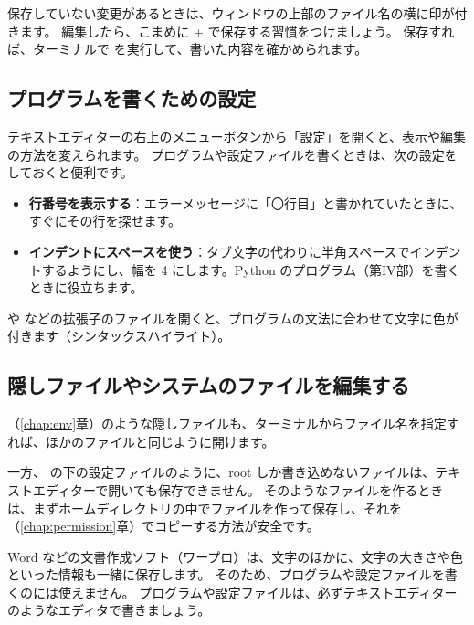 保存していない変更があるときは、ウィンドウの上部のファイル名の横に印が付きます。
編集したら、こまめに + で保存する習慣をつけましょう。
保存すれば、ターミナルで  を実行して、書いた内容を確かめられます。

\subsection{プログラムを書くための設定}

テキストエディターの右上のメニューボタンから「設定」を開くと、表示や編集の方法を変えられます。
プログラムや設定ファイルを書くときは、次の設定をしておくと便利です。

\begin{itemize}
  \item \textbf{行番号を表示する}：エラーメッセージに「〇行目」と書かれていたときに、すぐにその行を探せます。
  \item \textbf{インデントにスペースを使う}：タブ文字の代わりに半角スペースでインデントするようにし、幅を 4 にします。Python のプログラム（第IV部）を書くときに役立ちます。
\end{itemize}

 や  などの拡張子のファイルを開くと、プログラムの文法に合わせて文字に色が付きます（シンタックスハイライト）。

\subsection{隠しファイルやシステムのファイルを編集する}

（\ref{chap:env}章）のような隠しファイルも、ターミナルからファイル名を指定すれば、ほかのファイルと同じように開けます。


一方、 の下の設定ファイルのように、root しか書き込めないファイルは、テキストエディターで開いても保存できません。
そのようなファイルを作るときは、まずホームディレクトリの中でファイルを作って保存し、それを （\ref{chap:permission}章）でコピーする方法が安全です。

\begin{caution}[ワープロでプログラムを書かない]
  Word などの文書作成ソフト（ワープロ）は、文字のほかに、文字の大きさや色といった情報も一緒に保存します。
  そのため、プログラムや設定ファイルを書くのには使えません。
  プログラムや設定ファイルは、必ずテキストエディターのようなエディタで書きましょう。
\end{caution}

